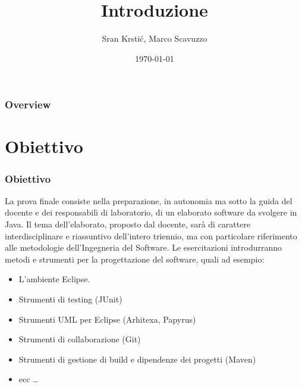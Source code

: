 \documentclass{beamer}
\title[Introduzione]{Introduzione} %
\author{Sr\dj{}an Krsti\'c, Marco Scavuzzo} %
\institute[] %
{
Politecnico di Milano \\ %
\medskip
\textit{srdan.krstic@polimi.it, marco.scavuzzo@.polimi.it} %
}
\date{\today} %
\begin{document}
\begin{frame}
\titlepage %
\end{frame}

\begin{frame}
\frametitle{Overview} %
\tableofcontents %
\end{frame}



\section{Obiettivo}
\begin{frame}
\frametitle{Obiettivo}
La prova finale consiste nella preparazione, in autonomia ma sotto la guida del docente e dei responsabili di laboratorio, di un elaborato software da svolgere in Java. Il tema dell'elaborato,  proposto dal docente, sar\`a  di carattere interdisciplinare e riassuntivo dell'intero triennio, ma con particolare riferimento alle metodologie dell'Ingegneria del Software. Le esercitazioni introdurranno metodi e strumenti per la progettazione del software, quali ad esempio:
\begin{itemize}
\item L'ambiente Eclipse.
\item Strumenti di testing (JUnit)
\item Strumenti UML per Eclipse (Arhitexa, Papyrus)
\item Strumenti di collaborazione (Git)
\item Strumenti di gestione di build e dipendenze  dei progetti (Maven)
\item ecc \ldots
\end{itemize}
\end{frame}
\end{document}
